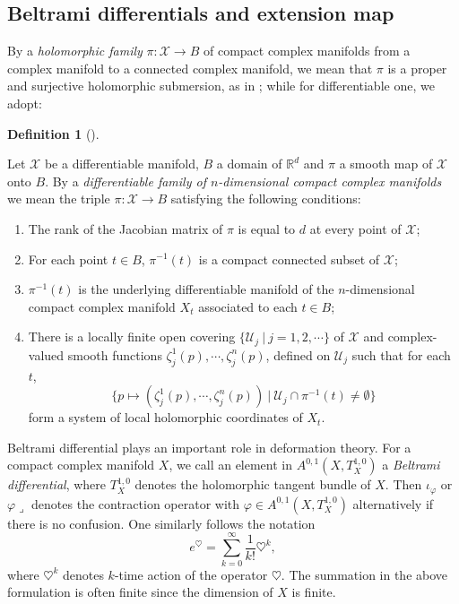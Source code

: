 \documentclass[12pt]{amsart}
\numberwithin{equation}{section}
\theoremstyle{definition}
\theoremstyle{definition}
\newtheorem{definition}  [theorem]     {Definition}
\theoremstyle{definition}
\renewcommand{\1}{\mathsf{1}}
\renewcommand{\>}{\rightarrow}
\def\mc{\mathcal}
\theoremstyle{plain} %
\theoremstyle{plain} %
\theoremstyle{plain} %
\begin{document}
	\subsection{Beltrami differentials and extension map}\label{subsection Deformation theory and extension equ }
	By a \textit{holomorphic family} $\pi:\mc{X}\rightarrow B$ of compact complex manifolds from a complex manifold to a connected complex manifold, we mean that $\pi$ is a proper and surjective holomorphic submersion, as in \cite[Definition 2.8]{Ko86}; while for differentiable one, we adopt:
	\begin{definition}[{\cite[Definition 4.1]{Ko86}}] \label{Differential family} {Let $\mc{X}$ be a differentiable manifold, $B$ a domain of $\mathbb{R}^d$ and $\pi$ a smooth map of $\mc{X}$ onto $B$.
			By a  \textit{differentiable family of $n$-dimensional compact complex manifolds} we mean the triple $\pi:\mc{X}\rightarrow B$ satisfying the following conditions:
			\begin{enumerate}[$(a)$]
				\item
				The rank of the Jacobian matrix of $\pi$ is equal to $d$ at every point of $\mc{X}$;
				\item
				For each point $t\in B$, $\pi^{-1}(t)$ is a compact connected subset of $\mc{X}$;
				\item
				$\pi^{-1}(t)$ is the underlying differentiable manifold of the $n$-dimensional compact complex manifold $X_t$ associated to each $t\in B$;
				\item
				There is a locally finite open covering $\{\mathcal{U}_j\ |\ j=1,2,\cdots\}$ of $\mc{X}$ and complex-valued smooth functions $\zeta_j^1(p),\cdots,\zeta_j^n(p)$, defined on $\mathcal{U}_j$ such that for each $t$, $$\{p\longmapsto (\zeta_j^1(p),\cdots,\zeta_j^n(p))\ |\ \mathcal{U}_j\cap \pi^{-1}(t)\neq \emptyset\}$$ form a system of local holomorphic coordinates of $X_t$.
		\end{enumerate}}
	\end{definition}
	
	Beltrami differential plays an important role in deformation theory. For a compact complex manifold $X$, we call  an element in $A^{0,1}(X,
	T^{1,0}_X)$ a \textit{Beltrami differential}, where $T^{1,0}_X$ denotes the holomorphic tangent
	bundle of $X$. Then $\iota_\varphi$ or $\varphi\lrcorner$ denotes the
	contraction operator with $\varphi\in A^{0,1}(X,T^{1,0}_X)$
	alternatively if there is no confusion. One similarly follows the
	notation
	\begin{equation*}\label{0e-convention}
		e^{\heartsuit}=\sum_{k=0}^\infty \frac{1}{k!} \heartsuit^{k},
	\end{equation*}
	where $\heartsuit^{k}$ denotes $k$-time action of the operator
	$\heartsuit$.  The summation in
	the above formulation is often finite since the dimension of $X$ is finite.
	
\end{document}
